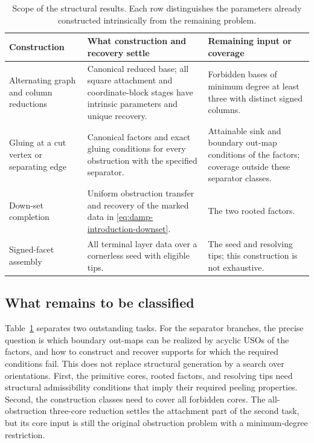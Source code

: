 \documentclass[11pt]{article}
\numberwithin{equation}{section}
\theoremstyle{definition}
\theoremstyle{remark}
\begin{document}
\begin{table}[tbp]
\centering
\small
\begin{tabular}{@{}p{.21\linewidth}p{.36\linewidth}p{.35\linewidth}@{}}
\toprule
Construction & What construction and recovery settle & Remaining input or coverage \\
\midrule
Alternating graph and column reductions &
Canonical reduced base; all square attachment and coordinate-block stages have intrinsic parameters and unique recovery. &
Forbidden bases of minimum degree at least three with distinct signed columns. \\
\addlinespace
Gluing at a cut vertex or separating edge &
Canonical factors and exact gluing conditions for every obstruction with the specified separator. &
Attainable sink and boundary out-map conditions of the factors; coverage outside these separator classes. \\
\addlinespace
Down-set completion &
Uniform obstruction transfer and recovery of the marked data in \eqref{eq:damp-introduction-downset}. &
The two rooted factors. \\
\addlinespace
Signed-facet assembly &
All terminal layer data over a cornerless seed with eligible tips. &
The seed and resolving tips; this construction is not exhaustive. \\
\bottomrule
\end{tabular}
\caption{Scope of the structural results.  Each row distinguishes the
parameters already constructed intrinsically from the remaining problem.}
\label{tab:damp-generative-scope}
\end{table}

\subsection{What remains to be classified}

Table~\ref{tab:damp-generative-scope} separates two outstanding tasks.
For the separator branches, the precise question is which boundary out-maps
can be realized by acyclic USOs of the factors, and how to construct and
recover supports for which the required conditions fail. This does not
replace structural generation by a search over orientations.
First, the primitive cores, rooted factors, and resolving tips need
structural admissibility conditions that imply their required peeling
properties.  Second, the construction classes need to cover all
forbidden cores.  The all-obstruction three-core reduction settles the
attachment part of the second task, but its core input is still the
original obstruction problem with a minimum-degree restriction.
\end{document}
